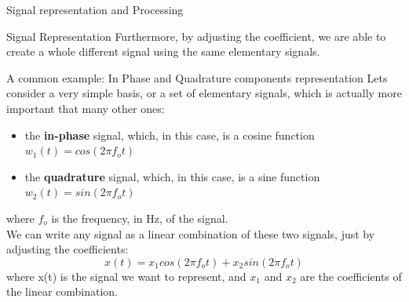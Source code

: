 \begin{section}{Signal representation and Processing}
\begin{subsection}{Signal Representation}
    Furthermore, by adjusting the coefficient, we are able to create a whole different signal using
    the same elementary signals.
    \begin{subsubsection}{A common example: In Phase and Quadrature components representation}
      \label{sub:IQ representation}
      Lets consider a very simple basis, or a set of elementary signals, which is actually more 
      important that many other ones:
      \begin{itemize}
        \item the \textbf{in-phase} signal, which, in this case, is a cosine function $w_1(t) = cos(2\pi f_o t)$
        \item the \textbf{quadrature} signal, which, in this case, is a sine function $w_2(t) = sin(2\pi f_o t)$
      \end{itemize}
      where $f_o$ is the frequency, in Hz, of the signal.\\
      We can write any signal as a linear combination of these two signals, just by adjusting the
      coefficients:
      \begin{equation}
        x(t) = x_1 cos(2\pi f_o t) + x_2 sin(2\pi f_o t)
      \end{equation}
      where x(t) is the signal we want to represent, and $x_1$ and $x_2$ are the coefficients of the
      linear combination.\\


\end{subsubsection}
\end{subsection}
\end{section}

